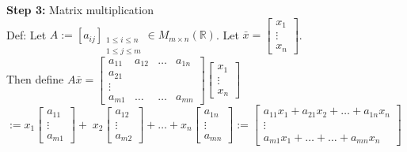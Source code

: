 \bigskip 

\noindent 
\textbf{Step 3:} Matrix multiplication \\
\noindent
Def: Let $A := [a_{ij}]_{\substack{1 \le i \le n \\ 1 \le j \le m}} 
\in M_{m \times n}(\mathbb{R})$. 
Let $\bar x = \begin{bmatrix}
    x_1 \\ \vdots \\ x_n
\end{bmatrix}$. \\
Then define
$A \bar x
= \begin{bmatrix}
    a_{11} & a_{12} & \ldots & a_{1n} \\ 
    a_{21} \\
    \vdots \\ 
    a_{m1} & \ldots & \ldots & a_{mn}
\end{bmatrix}
\begin{bmatrix}
    x_1 \\ \vdots \\ x_n
\end{bmatrix}$ \\
$:= x_1 
\begin{bmatrix}
    a_{11} \\ \vdots \\ a_{m1}
\end{bmatrix}
 + \; x_2 \begin{bmatrix}
    a_{12} \\ \vdots \\ a_{m2}
\end{bmatrix}
 + \ldots + x_n \begin{bmatrix}
    a_{1n} \\ \vdots \\ a_{mn}
\end{bmatrix} 
:= \begin{bmatrix}
    a_{11}x_1 + a_{21}x_2 + \ldots + a_{1n}x_n \\ 
    \vdots \\
    a_{m1}x_1 + \ldots + \ldots + a_{mn}x_n
\end{bmatrix}$
